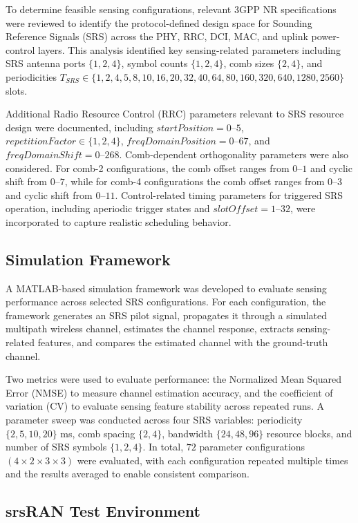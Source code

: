 \documentclass[conference]{IEEEtran}
\begin{document}
To determine feasible sensing configurations, relevant 3GPP NR specifications were reviewed to identify the protocol-defined design space for Sounding Reference Signals (SRS) across the PHY, RRC, DCI, MAC, and uplink power-control layers. This analysis identified key sensing-related parameters including SRS antenna ports $\{1,2,4\}$, symbol counts $\{1,2,4\}$, comb sizes $\{2,4\}$, and periodicities 
$T_{SRS} \in \{1,2,4,5,8,10,16,20,32,40,64,80,160,320,640,1280,2560\}$ slots.

Additional Radio Resource Control (RRC) parameters relevant to SRS resource design were documented, including $startPosition = 0$--$5$, $repetitionFactor \in \{1,2,4\}$, $freqDomainPosition = 0$--$67$, and $freqDomainShift = 0$--$268$. Comb-dependent orthogonality parameters were also considered. For comb-2 configurations, the comb offset ranges from $0$--$1$ and cyclic shift from $0$--$7$, while for comb-4 configurations the comb offset ranges from $0$--$3$ and cyclic shift from $0$--$11$. Control-related timing parameters for triggered SRS operation, including aperiodic trigger states and $slotOffset = 1$--$32$, were incorporated to capture realistic scheduling behavior.

\subsection{Simulation Framework}

A MATLAB-based simulation framework was developed to evaluate sensing performance across selected SRS configurations. For each configuration, the framework generates an SRS pilot signal, propagates it through a simulated multipath wireless channel, estimates the channel response, extracts sensing-related features, and compares the estimated channel with the ground-truth channel.

Two metrics were used to evaluate performance: the Normalized Mean Squared Error (NMSE) to measure channel estimation accuracy, and the coefficient of variation (CV) to evaluate sensing feature stability across repeated runs. A parameter sweep was conducted across four SRS variables: periodicity $\{2,5,10,20\}$ ms, comb spacing $\{2,4\}$, bandwidth $\{24,48,96\}$ resource blocks, and number of SRS symbols $\{1,2,4\}$. In total, $72$ parameter configurations $(4 \times 2 \times 3 \times 3)$ were evaluated, with each configuration repeated multiple times and the results averaged to enable consistent comparison.

\subsection{srsRAN Test Environment}
\end{document}
